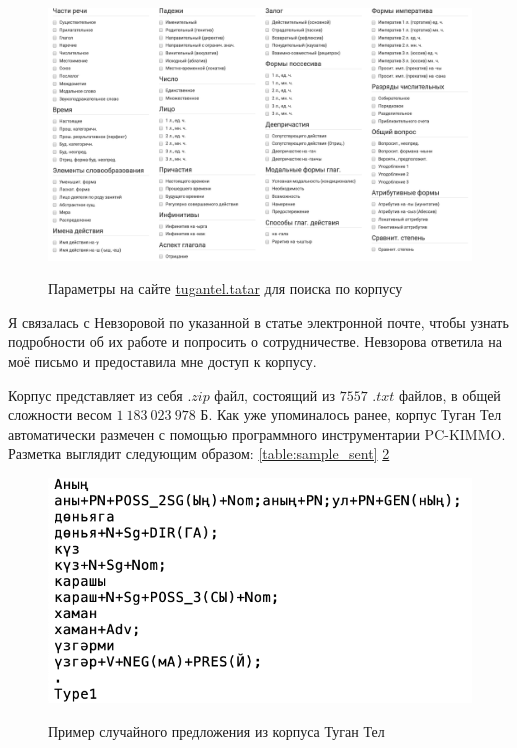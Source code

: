 \begin{figure}
\caption{Параметры на сайте \href{http://tugantel.tatar/}{tugantel.tatar} для поиска по корпусу}
\includegraphics[width=\textwidth]{pics/tugan_tel_1}
\label{fig:tugan_tel_1}
\end{figure}


Я связалась с Невзоровой по указанной в статье электронной почте, чтобы узнать подробности об их работе и попросить о сотрудничестве. Невзорова ответила на моё письмо и предоставила мне доступ к корпусу.

Корпус представляет из себя $.zip$ файл, состоящий из $7557$ $.txt$ файлов, в общей сложности весом $1\ 183\ 023\ 978$ Б. Как уже упоминалось ранее, корпус Туган Тел автоматически размечен с помощью программного инструментарии PC-KIMMO. Разметка выглядит следующим образом: \ref{table:sample_sent} \ref{fig:sample_sent}


\begin{figure}
\caption{Пример случайного предложения из корпуса Туган Тел}
\includegraphics[width=\textwidth]{pics/sample_sent}
\label{fig:sample_sent}
\end{figure}

